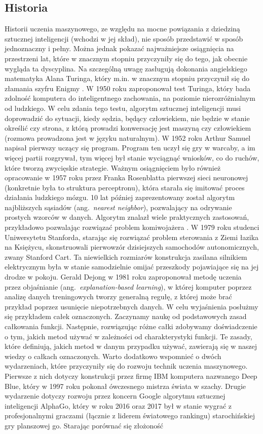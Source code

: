 \documentclass[12pt,a4paper,twoside,openany]{book}
\begin{document}
\subsection{Historia}
Historii uczenia maszynowego, ze względu na mocne powiązania z dziedziną sztucznej inteligencji (wchodzi w jej skład), nie sposób przedstawić w sposób jednoznaczny i pełny. Można jednak pokazać najważniejsze osiągnięcia na przestrzeni lat, które w znacznym stopniu przyczyniły się do tego, jak obecnie wygląda ta dyscyplina. Na szczególną uwagę zasługują dokonania angielskiego matematyka Alana Turinga, który m.in. w znacznym stopniu przyczynił się do złamania szyfru Enigmy \citep{hodges1983}. W 1950 roku zaproponował test Turinga, który bada zdolność komputera do inteligentnego zachowania, na poziomie nierozróżnialnym od ludzkiego. W celu zdania tego testu, algorytm sztucznej inteligencji musi doprowadzić do sytuacji, kiedy sędzia, będący człowiekiem, nie będzie w stanie określić czy strona, z którą prowadzi konwersację jest maszyną czy człowiekiem (rozmowa prowadzona jest w języku naturalnym). W 1952 roku Arthur Samuel napisał pierwszy uczący się program. Program ten uczył się gry w warcaby, a im więcej partii rozgrywał, tym więcej był stanie wyciągnąć wniosków, co do ruchów, które tworzą zwycięskie strategie. Ważnym osiągnięciem było również opracowanie w 1957 roku przez Franka Rosenblatta pierwszej sieci neuronowej (konkretnie była to struktura perceptronu), która starała się imitować proces działania ludzkiego mózgu. 10 lat później zaprezentowany został algorytm najbliższych sąsiadów (ang.~\textit{nearest neighbor}), pozwalający na odrywanie prostych wzorców w danych. Algorytm znalazł wiele praktycznych zastosowań, przykładowo pozwalając rozwiązać problem komiwojażera \citep{lin1973}. W 1979 roku studenci Uniwersytetu Stanforda, starając się rozwiązać problem sterowania z Ziemi łazika na Księżycu, skonstruowali pierwowzór dzisiejszych samochodów autonomicznych, zwany Stanford Cart. Ta niewielkich rozmiarów konstrukcja zasilana silnikiem elektrycznym była w stanie samodzielnie omijać przeszkody pojawiające się na jej drodze w pokoju. Gerald Dejong w 1981 roku zaproponował metodę uczenia przez objaśnianie (ang.~\textit{explanation-based learning}), w której komputer poprzez analizę danych treningowych tworzy generalną regułę, z której może brać przykład poprzez usunięcie niepotrzebnych danych. W celu wyjaśnienia posłużmy się przykładem całek oznaczonych. Zaczynamy naukę od podstawowych zasad całkowania funkcji. Następnie, rozwiązując różne całki zdobywamy doświadczenie o tym, jakich metod używać w zależności od charakterystyki funkcji. Te zasady, które definiują, jakich metod w danym przypadku używać, zawierają się w naszej wiedzy o całkach oznaczonych. Warto dodatkowo wspomnieć o dwóch wydarzeniach, które przyczyniły się do rozwoju technik uczenia maszynowego. Pierwsze z nich dotyczy konstrukcji przez firmę IBM komputera nazwanego Deep Blue, który w 1997 roku pokonał ówczesnego mistrza świata w szachy. Drugie wydarzenie dotyczy rozwoju przez koncern Google algorytmu sztucznej inteligencji AlphaGo, który w roku 2016 oraz 2017 był w stanie wygrać z profesjonalnymi graczami (łącznie z liderem światowego rankingu) starochińskiej gry planszowej go. Starając porównać się złożoność 
\end{document}
